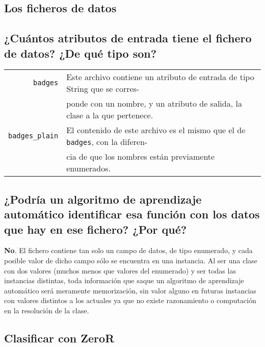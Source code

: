 \documentclass[12pt]{article}
\begin{document}
\tableofcontents

\newpage

\begin{center}
\section{Los ficheros de datos}
\end{center}

\subsection*{\small ¿Cuántos atributos de entrada tiene el fichero de datos?
¿De qué tipo son?}

\begin{tabular}{rl}
  \texttt{badges} & Este archivo contiene un atributo de entrada de tipo String
  que se corres- \\ &ponde con un nombre, y un atributo de salida, la clase a la
  que pertenece.\\
  \texttt{badges\_plain} & El contenido de este archivo es el mismo que el de
  \texttt{badges}, con la diferen- \\ &cia de que los nombres están previamente
  enumerados.
\end{tabular}

\subsection*{\small ¿Podría un algoritmo de aprendizaje automático identificar
esa función con los datos que hay en ese fichero? ¿Por qué?}

\textbf{No}. El fichero contiene tan solo un campo de datos, de tipo enumerado,
y cada posible valor de dicho campo sólo se encuentra en una instancia. Al ser
una clase con dos valores (muchos menos que valores del enumerado) y ser todas
las instancias distintas, toda información que saque un algoritmo de aprendizaje
automático será meramente memorización, sin valor alguno en futuras instancias
con valores distintos a los actuales ya que no existe razonamiento o
computación en la resolución de la clase.

\newpage

\begin{center}
\section{Clasificar con ZeroR}
\end{center}
\end{document}
